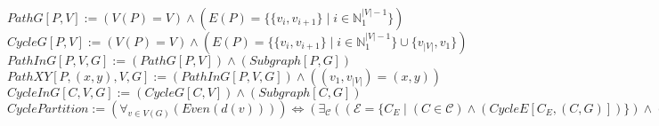 \documentclass{book}
\newcommand{\abr}{:=}
\newcommand{\st}{\mathbin{|}}
\newcommand{\utup}[1]{\{#1\}}
\begin{document}
$PathG[P, V] \abr (V(P) = V) \land (E(P) = \{\utup{v_i, v_{i + 1}} \st i \in \mathbb{N}_1^{|V| - 1}\})$ \\
$CycleG[P, V] \abr (V(P) = V) \land (E(P) = \{\utup{v_i, v_{i + 1}} \st i \in \mathbb{N}_1^{|V| - 1}\} \cup \{v_{|V|}, v_1\})$ \\
$PathInG[P, V, G] \abr (PathG[P, V]) \land (Subgraph[P, G])$ \\
$PathXY[P, (x, y), V, G] \abr (PathInG[P, V, G]) \land ((v_1, v_{|V|}) = (x, y))$ \\
$CycleInG[C, V, G] \abr (CycleG[C, V]) \land (Subgraph[C, G])$ \\

$CyclePartition \abr (\forall_{v \in V(G)}(Even(d(v)))) \iff (\exists_{\mathcal{C}}((\mathcal{E} = \{C_E \st (C \in \mathcal{C}) \land (CycleE[C_E, (C, G)])\}) \land (Partition[\mathcal{E}, E(G)])))$ \\
\end{document}
